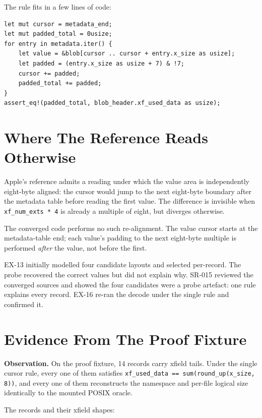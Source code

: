 The rule fits in a few lines of code:

\begin{verbatim}
let mut cursor = metadata_end;
let mut padded_total = 0usize;
for entry in metadata.iter() {
    let value = &blob[cursor .. cursor + entry.x_size as usize];
    let padded = (entry.x_size as usize + 7) & !7;
    cursor += padded;
    padded_total += padded;
}
assert_eq!(padded_total, blob_header.xf_used_data as usize);
\end{verbatim}

\section{Where The Reference Reads Otherwise}

Apple's reference admits a reading under which the value area is
independently eight-byte aligned: the cursor would jump to the next
eight-byte boundary after the metadata table before reading the
first value. The difference is invisible when
\texttt{xf\_num\_exts * 4} is already a multiple of eight, but
diverges otherwise.

The converged code performs no such re-alignment. The value cursor
starts at the metadata-table end; each value's padding to the next
eight-byte multiple is performed \emph{after} the value, not before
the first.

EX-13 initially modelled four candidate layouts and selected
per-record. The probe recovered the correct values but did not
explain why. SR-015 reviewed the converged sources and showed the
four candidates were a probe artefact: one rule explains every
record. EX-16 re-ran the decode under the single rule and
confirmed it.

\section{Evidence From The Proof Fixture}

\textbf{Observation.} On the proof fixture, 14 records carry
xfield tails. Under the single cursor rule, every one of them
satisfies \texttt{xf\_used\_data == sum(round\_up(x\_size, 8))}, and
every one of them reconstructs the namespace and per-file logical
size identically to the mounted POSIX oracle.

The records and their xfield shapes:


